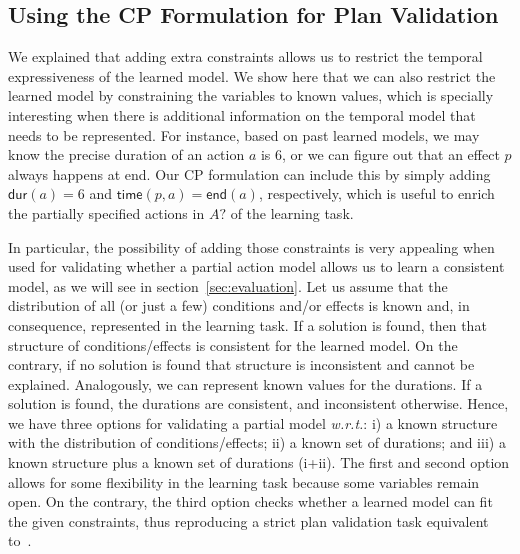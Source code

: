 \documentclass{ecai}
\newcommand{\dur}{\mathsf{dur}}    %
\newcommand{\en}{\mathsf{end}}     %
\newcommand{\tim}{\mathsf{time}}   %
\begin{document}


\subsection{Using the CP Formulation for Plan Validation}
\label{sec:usingCPValidation}

We explained that adding extra constraints allows us to restrict the temporal expressiveness of the learned model. We show here that we can also restrict the learned model by constraining the variables to known values, which is specially interesting when there is additional information on the temporal model that needs to be represented. For instance, based on past learned models, we may know the precise duration of an action $a$ is 6,
or we can figure out that an effect $p$ always happens at end.
Our CP formulation can include this by simply adding $\dur(a)=6$ and $\tim(p,a)=\en(a)$, respectively, which is useful to enrich the partially specified actions in $A?$ of the learning task.

In particular, the possibility of adding those constraints is very appealing when used for validating whether a partial action model allows us to learn a consistent model, as we will see in section~\ref{sec:evaluation}.
Let us assume that the distribution of all (or just a few) conditions and/or effects is known and, in consequence, represented in the learning task. If a solution is found, then that structure of conditions/effects is consistent for the learned model. On the contrary, if no solution is found that structure is inconsistent and cannot be explained.
Analogously, we can represent known values for the durations. If a solution is found, the durations are consistent, and inconsistent otherwise.
Hence, we have three options for validating a partial model \emph{w.r.t.}: i) a known structure with the distribution of conditions/effects; ii) a known set of durations; and iii) a known structure plus a known set of durations (i+ii).
The first and second option allows for some flexibility in the learning task because some variables remain open. On the contrary, the third option checks whether a learned model can fit the given constraints, thus reproducing a strict plan validation task equivalent to~\cite{howey2004val}.
\end{document}

